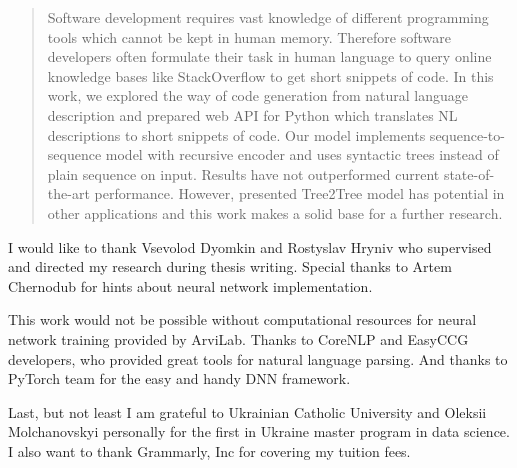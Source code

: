 \documentclass[
12pt, %
oneside, %
english, %
onehalfspacing, %
nolistspacing, %
liststotoc, %
parskip, %
headsepline, %
]{MastersDoctoralThesis} %
\begin{document}
\cleardoublepage

\begin{abstract}
\addchaptertocentry{\abstractname} 
Software development requires vast knowledge of different programming tools which cannot be kept in human memory. Therefore software developers often formulate their task in human language to query online knowledge bases like StackOverflow to get short snippets of code. In this work, we explored the way of code generation from natural language description and prepared web API for Python which translates NL descriptions to short snippets of code. Our model implements sequence-to-sequence model with recursive encoder and uses syntactic trees instead of plain sequence on input. Results have not outperformed current state-of-the-art performance. However, presented Tree2Tree model has potential in other applications and this work makes a solid base for a further research.
\end{abstract}


\begin{acknowledgements}
\addchaptertocentry{\acknowledgementname} %
I would like to thank Vsevolod Dyomkin and Rostyslav Hryniv who supervised and directed my research during thesis writing. Special thanks to Artem Chernodub for hints about neural network implementation.

This work would not be possible without computational resources for neural network training provided by ArviLab. Thanks to CoreNLP and EasyCCG developers, who provided great tools for natural language parsing. And thanks to PyTorch team for the easy and handy DNN framework.

Last, but not least I am grateful to Ukrainian Catholic University and Oleksii Molchanovskyi personally for the first in Ukraine master program in data science. I also want to thank Grammarly, Inc for covering my tuition fees.
\end{acknowledgements}


\tableofcontents %
\end{document}
